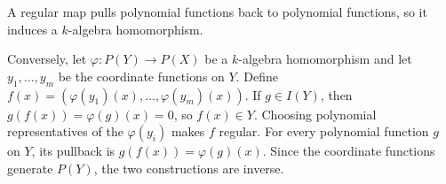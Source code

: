 A regular map pulls polynomial functions back to polynomial functions, so it induces a $k$-algebra homomorphism.

Conversely, let $\varphi:P(Y)\to P(X)$ be a $k$-algebra homomorphism and let $y_1,\ldots,y_m$ be the coordinate functions on $Y$. Define $f(x)=(\varphi(y_1)(x),\ldots,\varphi(y_m)(x))$. If $g\in I(Y)$, then $g(f(x))=\varphi(g)(x)=0$, so $f(x)\in Y$. Choosing polynomial representatives of the $\varphi(y_i)$ makes $f$ regular. For every polynomial function $g$ on $Y$, its pullback is $g(f(x))=\varphi(g)(x)$. Since the coordinate functions generate $P(Y)$, the two constructions are inverse.
